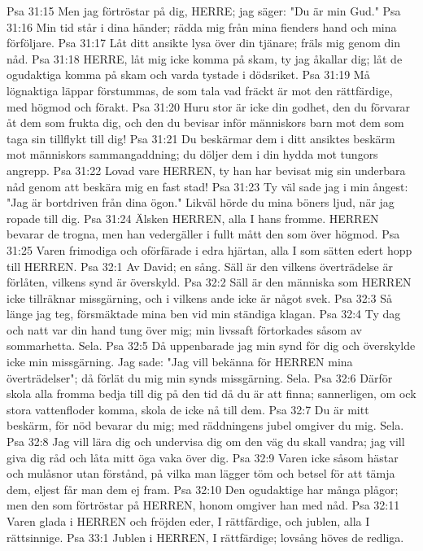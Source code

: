 Psa 31:15  Men jag förtröstar på dig, HERRE; jag säger: "Du är min Gud."
Psa 31:16  Min tid står i dina händer; rädda mig från mina fienders hand och mina förföljare.
Psa 31:17  Låt ditt ansikte lysa över din tjänare; fräls mig genom din nåd.
Psa 31:18  HERRE, låt mig icke komma på skam, ty jag åkallar dig; låt de ogudaktiga komma på skam och varda tystade i dödsriket.
Psa 31:19  Må lögnaktiga läppar förstummas, de som tala vad fräckt är mot den rättfärdige, med högmod och förakt.
Psa 31:20  Huru stor är icke din godhet, den du förvarar åt dem som frukta dig, och den du bevisar inför människors barn mot dem som taga sin tillflykt till dig!
Psa 31:21  Du beskärmar dem i ditt ansiktes beskärm mot människors sammangaddning; du döljer dem i din hydda mot tungors angrepp.
Psa 31:22  Lovad vare HERREN, ty han har bevisat mig sin underbara nåd genom att beskära mig en fast stad!
Psa 31:23  Ty väl sade jag i min ångest: "Jag är bortdriven från dina ögon." Likväl hörde du mina böners ljud, när jag ropade till dig.
Psa 31:24  Älsken HERREN, alla I hans fromme. HERREN bevarar de trogna, men han vedergäller i fullt mått den som över högmod.
Psa 31:25  Varen frimodiga och oförfärade i edra hjärtan, alla I som sätten edert hopp till HERREN.
Psa 32:1  Av David; en sång. Säll är den vilkens överträdelse är förlåten, vilkens synd är överskyld.
Psa 32:2  Säll är den människa som HERREN icke tillräknar missgärning, och i vilkens ande icke är något svek.
Psa 32:3  Så länge jag teg, försmäktade mina ben vid min ständiga klagan.
Psa 32:4  Ty dag och natt var din hand tung över mig; min livssaft förtorkades såsom av sommarhetta. Sela.
Psa 32:5  Då uppenbarade jag min synd för dig och överskylde icke min missgärning. Jag sade: "Jag vill bekänna för HERREN mina överträdelser"; då förlät du mig min synds missgärning. Sela.
Psa 32:6  Därför skola alla fromma bedja till dig på den tid då du är att finna; sannerligen, om ock stora vattenfloder komma, skola de icke nå till dem.
Psa 32:7  Du är mitt beskärm, för nöd bevarar du mig; med räddningens jubel omgiver du mig. Sela.
Psa 32:8  Jag vill lära dig och undervisa dig om den väg du skall vandra; jag vill giva dig råd och låta mitt öga vaka över dig.
Psa 32:9  Varen icke såsom hästar och mulåsnor utan förstånd, på vilka man lägger töm och betsel för att tämja dem, eljest får man dem ej fram.
Psa 32:10  Den ogudaktige har många plågor; men den som förtröstar på HERREN, honom omgiver han med nåd.
Psa 32:11  Varen glada i HERREN och fröjden eder, I rättfärdige, och jublen, alla I rättsinnige.
Psa 33:1  Jublen i HERREN, I rättfärdige; lovsång höves de redliga.
